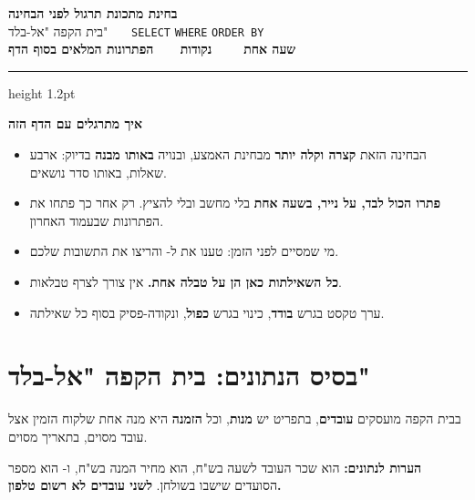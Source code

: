 \documentclass[11pt,a4paper]{article}
\begin{document}
\begin{center}
{\LARGE\bfseries\color{inkblue} בחינת מתכונת \textendash{} תרגול לפני הבחינה}\\[3pt]
{\large בית הקפה "אל-בלד" \ \textbullet\ \ \texttt{SELECT} \textbullet{} \texttt{WHERE} \textbullet{} \texttt{ORDER BY}}\\[6pt]
{\large\bfseries שעה אחת \ \textbar\ \  נקודות \ \textbar\ \ הפתרונות המלאים בסוף הדף}
\end{center}
\vspace{2pt}
{\color{inkblue}\hrule height 1.2pt}
\vspace{8pt}

\begin{panel}
\textbf{איך מתרגלים עם הדף הזה}
\begin{itemize}[leftmargin=1.3em, itemsep=2pt, topsep=3pt]
  \item הבחינה הזאת \textbf{קצרה וקלה יותר} מבחינת האמצע, ובנויה \textbf{באותו מבנה} בדיוק: ארבע שאלות, באותו סדר נושאים.
  \item \textbf{פתרו הכול לבד, על נייר, בשעה אחת} \textendash{} בלי מחשב ובלי להציץ. רק אחר כך פתחו את הפתרונות שבעמוד האחרון.
  \item מי שמסיים לפני הזמן: טענו את  ל- והריצו את התשובות שלכם.
  \item \textbf{כל השאילתות כאן הן על טבלה אחת.} אין צורך לצרף טבלאות.
  \item ערך טקסט בגרש \textbf{בודד}, כינוי בגרש \textbf{כפול}, ונקודה-פסיק בסוף כל שאילתה.
\end{itemize}
\end{panel}

\vspace{6pt}
\section*{בסיס הנתונים: בית הקפה "אל-בלד"}
\vspace{6pt}

בבית הקפה מועסקים \textbf{עובדים}, בתפריט יש \textbf{מנות}, וכל \textbf{הזמנה} היא מנה אחת שלקוח הזמין אצל עובד מסוים, בתאריך מסוים.

\vspace{2pt}
{\small\textbf{הערות לנתונים:}  הוא שכר העובד לשעה בש"ח,  הוא מחיר המנה בש"ח, ו- הוא מספר הסועדים שישבו בשולחן. \textbf{לשני עובדים לא רשום טלפון.}}
\end{document}
